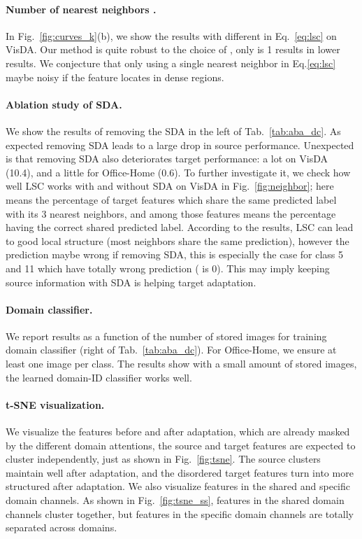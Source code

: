 \documentclass[10pt,twocolumn,letterpaper]{article}
\begin{document}
\vspace{-2mm}
\paragraph{Number of nearest neighbors .} In Fig.~\ref{fig:curves_k}(b), we show the results with different  in Eq.~\ref{eq:lsc} on VisDA. Our method is quite robust to the choice of , only  is 1 results in lower results. We conjecture that only using a single nearest neighbor in Eq.\ref{eq:lsc} maybe noisy if the feature locates in dense regions.  

\vspace{-2mm}
\paragraph{Ablation study of SDA.} We show the results of removing the SDA in the left of Tab.~\ref{tab:aba_dc}. As expected removing SDA leads to a large drop in source performance. Unexpected is that removing SDA also deteriorates target performance: a lot on VisDA (10.4), and a little for Office-Home (0.6). To further investigate it, we check how well LSC works with and without SDA on VisDA in Fig.~\ref{fig:neighbor}; here  means the percentage of target features which share the same predicted label with its 3 nearest neighbors, and among those features  means the percentage having the correct shared predicted label. According to the results, LSC can lead to good local structure (most neighbors share the same prediction), however the prediction maybe wrong if removing SDA, this is especially the case for class 5 and 11 which have totally wrong prediction ( is 0). This may imply keeping source information with SDA is helping target adaptation.

\vspace{-2mm}
\paragraph{Domain classifier.} {We report results as a function of the number of stored images for training domain classifier (right of Tab.~\ref{tab:aba_dc}). For Office-Home, we ensure at least one image per class. The results show with a small amount of stored images, the learned domain-ID classifier works well.
}

\vspace{-2mm}
\paragraph{t-SNE visualization.} We visualize the features before and after adaptation, which are already masked by the different domain attentions, the source and target features are expected to cluster independently, just as shown in Fig.~\ref{fig:tsne}. The source clusters maintain well after adaptation, and the disordered target features turn into more structured after adaptation. We also visualize features in the shared and specific domain channels. As shown in Fig.~\ref{fig:tsne_ss}, features in the shared domain channels cluster together, but features in the specific domain channels are totally separated across domains.
\end{document}
